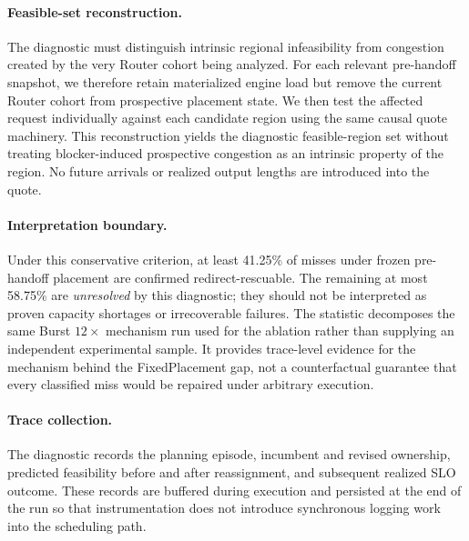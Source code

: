 \paragraph{Feasible-set reconstruction.}
The diagnostic must distinguish intrinsic regional infeasibility from
congestion created by the very Router cohort being analyzed.
For each relevant pre-handoff snapshot, we therefore retain materialized engine
load but remove the current Router cohort from prospective placement state.
We then test the affected request individually against each candidate region
using the same causal quote machinery.
This reconstruction yields the diagnostic feasible-region set without treating
blocker-induced prospective congestion as an intrinsic property of the region.
No future arrivals or realized output lengths are introduced into the quote.

\paragraph{Interpretation boundary.}
Under this conservative criterion, at least 41.25\% of misses under frozen
pre-handoff placement are confirmed redirect-rescuable.
The remaining at most 58.75\% are \emph{unresolved} by this diagnostic; they
should not be interpreted as proven capacity shortages or irrecoverable
failures.
The statistic decomposes the same Burst $12\times$ mechanism run used for the
ablation rather than supplying an independent experimental sample.
It provides trace-level evidence for the mechanism behind the
FixedPlacement gap, not a counterfactual guarantee that every classified miss
would be repaired under arbitrary execution.

\paragraph{Trace collection.}
The diagnostic records the planning episode, incumbent and revised ownership,
predicted feasibility before and after reassignment, and subsequent realized
SLO outcome.
These records are buffered during execution and persisted at the end of the
run so that instrumentation does not introduce synchronous logging work into
the scheduling path.


